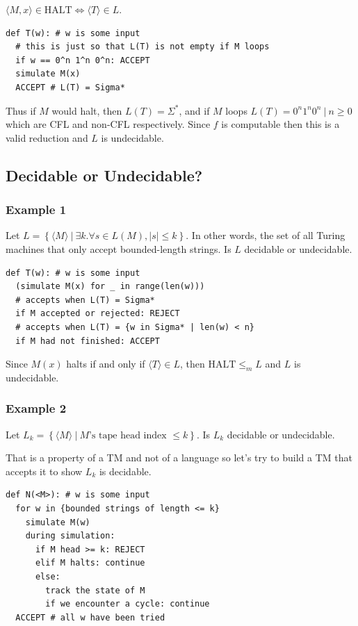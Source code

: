 $\langle M, x \rangle\in\textrm{HALT} \iff \langle T \rangle \in L$.


\begin{verbatim}
def T(w): # w is some input
  # this is just so that L(T) is not empty if M loops
  if w == 0^n 1^n 0^n: ACCEPT
  simulate M(x)
  ACCEPT # L(T) = Sigma*
\end{verbatim}

Thus if $M$ would halt, then $L(T) = \Sigma^\ast$, and if $M$ loops
$L(T) = {0^n1^n0^n ~|~ n\geq 0}$ which are CFL and non-CFL respectively.
Since $f$ is computable then this is a valid reduction and $L$ is
undecidable.

\subsection{Decidable or Undecidable?}
\subsubsection{Example 1}
Let $L = \left\{\langle M \rangle ~|~ \exists k. \forall s\in L(M),
\left|s\right|\leq k\right\}$. In other words, the set of all Turing
machines that only accept bounded-length strings. Is $L$ decidable or
undecidable.

\begin{verbatim}
def T(w): # w is some input
  (simulate M(x) for _ in range(len(w)))
  # accepts when L(T) = Sigma*
  if M accepted or rejected: REJECT
  # accepts when L(T) = {w in Sigma* | len(w) < n}
  if M had not finished: ACCEPT
\end{verbatim}

Since $M(x)$ halts if and only if $\langle T \rangle \in L$, then
$\textrm{HALT} \leq_m L$ and $L$ is undecidable.
\subsubsection{Example 2}
Let $L_k = \left\{\langle M \rangle ~|~ M\textrm{'s tape head index }\leq k\right\}$. Is $L_k$ decidable or
undecidable.

That is a property of a TM and not of a language so let's try to build a
TM that accepts it to show $L_k$ is decidable.

\begin{verbatim}
def N(<M>): # w is some input
  for w in {bounded strings of length <= k}
    simulate M(w)
    during simulation:
      if M head >= k: REJECT
      elif M halts: continue
      else:
        track the state of M
        if we encounter a cycle: continue
  ACCEPT # all w have been tried
\end{verbatim}

